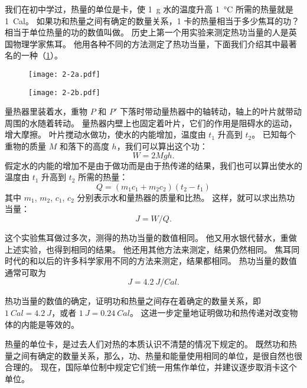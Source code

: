 我们在初中学过，热量的单位是卡，使 \qty{1}{g} 水的温度升高 \qty{1}{\celsius} 所需的热量就是 \qty{1}{Cal}。
如果功和热量之间有确定的数量关系，1 卡的热量相当于多少焦耳的功？
相当于单位热量的功的数值叫做。
历史上第一个用实验来测定热功当量的人是英国物理学家焦耳。
他用各种不同的方法测定了热功当量，下面我们介绍其中最著名的一种（\cref{fig:2-2}）。

\begin{figure}
	\begin{minipage}[b]{0.52\linewidth}\centering
		\texttt{[image: 2-2a.pdf]}
	\end{minipage}
	\begin{minipage}[b]{0.43\linewidth}\centering
		\texttt{[image: 2-2b.pdf]}
	\end{minipage}
	\caption{}\label{fig:2-2}
\end{figure}

量热器里装着水，重物 $P$ 和 $P'$ 下落时带动量热器中的轴转动，轴上的叶片就带动周围的水随着转动。
量热器内壁上也固定着叶片，它们的作用是阻碍水的运动，增大摩擦。
叶片搅动水做功，使水的内能增加，温度由 $t_1$ 升高到 $t_2$。
已知每个重物的质量 $M$ 和落下的高度 $h$，我们可以算出这个功：
\[ W=2Mgh.\]
假定水的内能的增加不是由于做功而是由于热传递的结果，我们也可以算出使水的温度由 $t_1$ 升高到 $t_2$ 所需的热量：
\[Q=(m_1c_1+m_2c_2)(t_2-t_1)\]
其中 $m_1$, $m_2$, $c_1$, $c_2$ 分别表示水和量热器的质量和比热。
这样，就可以求出热功当量：
\[J=W/Q.\]

这个实验焦耳做过多次，测得的热功当量的数值相同。
他又用水银代替水，重做上述实验，也得到相同的结果。
他还用其他方法来测定，结果仍然相同。
焦耳同时代的和以后的许多科学家用不同的方法来测定，结果都相同。
热功当量的数值通常可取为
\[ J=\qty{4.2}{J/Cal}.\]

热功当量的数值的确定，证明功和热量之间存在着确定的数量关系，即 $\qty{1}{Cal}=\qty{4.2}{J}$，或者 $\qty{1}{J}=\qty{0.24}{Cal}$。
这进一步定量地证明做功和热传递对改变物体的内能是等效的。

热量的单位卡，是过去人们对热的本质认识不清楚的情况下规定的。
既然功和热量之间有确定的数量关系，那么，功、热量和能量使用相同的单位，是很自然也很合理的。
现在，国际单位制中规定它们统一用焦作单位，并建议逐步取消卡这个单位。

